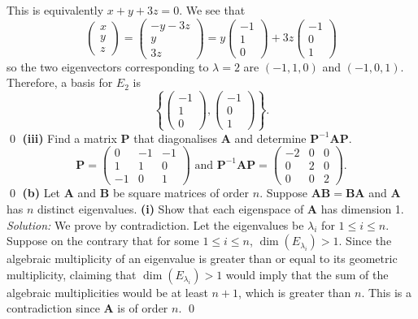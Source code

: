 \documentclass{article}
\begin{document}
This is equivalently $x+y+3z=0$. We see that \[\begin{pmatrix}
    x\\y\\z
\end{pmatrix}=\begin{pmatrix}
    -y-3z\\y\\3z
\end{pmatrix}=y\begin{pmatrix}
    -1\\1\\0
\end{pmatrix}+3z\begin{pmatrix}
    -1\\0\\1
\end{pmatrix}\] so the two eigenvectors corresponding to $\lambda=2$ are $(-1,1,0)$ and $(-1,0,1)$. Therefore, a basis for $E_2$ is \[\left\{\begin{pmatrix}
    -1\\1\\0
\end{pmatrix},\begin{pmatrix}
    -1\\0\\1
\end{pmatrix}\right\}.\] \qed
\newline
\newline\textbf{(iii)} Find a matrix $\mathbf{P}$ that diagonalises $\mathbf{A}$ and determine $\mathbf{P}^{-1}\mathbf{AP}$.
\[\mathbf{P}=\begin{pmatrix}0&-1&-1\\1&1&0\\-1&0&1\end{pmatrix}\text{ and }\mathbf{P}^{-1}\mathbf{AP}=\begin{pmatrix}-2&0&0\\0&2&0\\0&0&2\end{pmatrix}.\] \qed
\newline
\newline\textbf{(b)} Let $\mathbf{A}$ and $\mathbf{B}$ be square matrices of order $n$. Suppose $\mathbf{AB}=\mathbf{BA}$ and $\mathbf{A}$ has $n$ distinct eigenvalues.
\newline
\newline\textbf{(i)} Show that each eigenspace of $\mathbf{A}$ has dimension 1.
\newline\textit{Solution:} We prove by contradiction. Let the eigenvalues be $\lambda_i$ for $1 \le i \le n$. Suppose on the contrary that for some $1 \le i \le n$, $\operatorname{dim}(E_{\lambda_i})>1$. Since the algebraic multiplicity of an eigenvalue is greater than or equal to its geometric multiplicity, claiming that $\operatorname{dim}(E_{\lambda_i})>1$ would imply that the sum of the algebraic multiplicities would be at least $n+1$, which is greater than $n$. This is a contradiction since $\mathbf{A}$ is of order $n$. \qed
\end{document}
